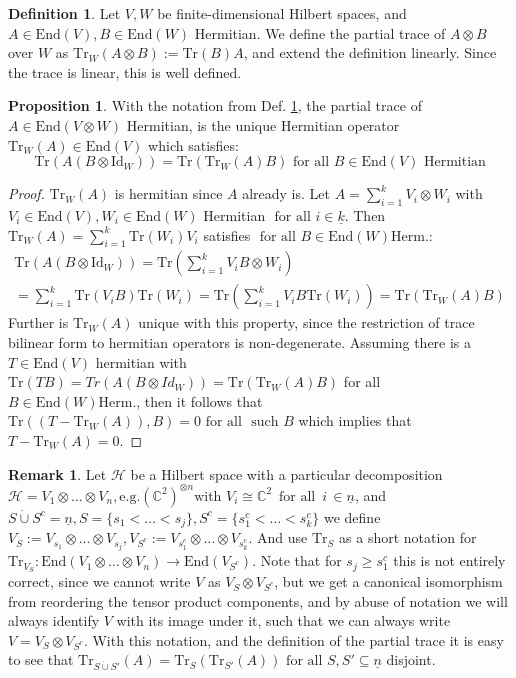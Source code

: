 \documentclass[12pt,a4paper,BCOR15mm,twoside,DIV12]{article}
\def\C{\mathbb{C}}
\def\n{\underline{n}}
\def\End{\text{End}}
\def\fa{\text{ for all }}
\def\Tr{\text{Tr}}
\def\Id{\text{Id}}
\theoremstyle{definition}
\newtheorem{prop}[Satz]{Proposition}
\newtheorem{rem}[Satz]{Remark}
\newtheorem{defn}[Satz]{Definition}
\begin{document}
\begin{defn}\label{traces}
Let $V, W$ be finite-dimensional Hilbert spaces, and $A \in \text{End}(V), B \in \End(W)$ Hermitian. We define the partial trace of $A \otimes B$ over $W$ as $\Tr_W(A \otimes B) := \Tr(B) A$, and extend the definition linearly. Since the trace is linear, this is well defined.
\end{defn}

\begin{prop}
With the notation from Def. \ref{traces}, the partial trace of $A \in \End(V \otimes W)$ Hermitian, is the unique Hermitian operator $\Tr_W(A) \in \End(V)$ which satisfies:
 \begin{equation} \Tr(A(B \otimes \Id_W)) = \Tr(\Tr_W(A)B) \fa B \in \End(V) \text{ Hermitian} \end{equation}
\begin{proof}
$ \Tr_W(A)$ is hermitian since $A$ already is. Let $ A = \sum_{i=1}^k V_i \otimes W_i$ with $V_i \in \End(V), W_i \in \End(W)$ Hermitian $\fa i \in \underline{k}$. Then $\Tr_W(A) = \sum_{i=1}^k \Tr(W_i) V_i$ satisfies  $\fa B \in \End(W) \text{Herm.}$:
\begin{align*} \Tr(A(B \otimes \Id_W)) = \Tr( \sum_{i=1}^k V_i B \otimes W_i ) \\ = \sum_{i=1}^k \Tr(V_i B) \Tr(W_i) = \Tr( \sum_{i=1}^k V_i B \Tr(W_i)) = \Tr( \Tr_W(A) B) \end{align*}
Further is $\Tr_W(A)$ unique with this property, since the restriction of trace bilinear form to hermitian operators is non-degenerate. Assuming there is a $T \in \End(V)$ hermitian with $\Tr(TB) = Tr(A(B \otimes Id_W)) = \Tr(\Tr_W(A)B)$ for all $B \in \End(W) \text{Herm.}$, 
then it follows that $\Tr( (T-\Tr_W(A)), B) = 0 \fa \text{ such } B$ which implies that $ T - \Tr_W(A) = 0$.
\end{proof}
\end{prop}

\begin{rem}\label{rempartr}
Let $\mathcal{H}$ be a Hilbert space with a particular decomposition $\mathcal{H} = V_1 \otimes \ldots \otimes V_n, \text{e.g.} (\C^2)^{\otimes n} \text{with } V_i \cong \C^2 \, \fa \, i \, \in \n$, and $S \dot{\cup} S^c = \underline{n}, S = \{ s_1 < \ldots < s_j \}, S^c = \{ s^c_1 < \ldots < s^c_k \}$ we define $V_S := V_{s_1} \otimes \ldots \otimes V_{s_j}, V_{S^c} := V_{s^c_1} \otimes \ldots \otimes V_{s^c_k}$.
And use $\Tr_S$  as a short notation for $\Tr_{V_S} : \End(V_1 \otimes \ldots \otimes V_n) \rightarrow \End(V_{S^c})$. Note that for $s_j \geq s_1^c$ this is not entirely correct, since we cannot write $V$ as $V_S \otimes V_{S^c}$, but we get a canonical isomorphism from reordering the tensor product components, and by abuse of notation we will always identify $V$ with its image under it, such that we can always write $V = V_S \otimes V_{S^c}$.
With this notation, and the definition of the partial trace it is easy to see that $\Tr_{S \dot \cup S'}(A) = \Tr_S(\Tr_{S'}(A)) \fa S,S' \subseteq \n$ disjoint.
\end{rem}
\end{document}
